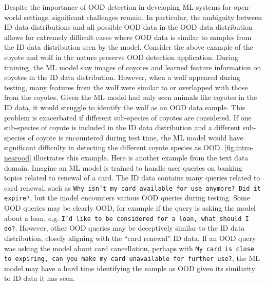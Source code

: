 Despite the importance of OOD detection in developing ML systems for open-world settings, significant challenges remain. In particular, the ambiguity between ID data distributions and all possible OOD data in the OOD data distribution allows for extremely difficult cases where OOD data is similar to samples from the ID data distribution seen by the model. Consider the above example of the coyote and wolf in the nature preserve OOD detection application. During training, the ML model saw images of coyotes and learned feature information on coyotes in the ID data distribution. However, when a wolf appeared during testing, many features from the wolf were similar to or overlapped with those from the coyotes. Given the ML model had only seen animals like coyotes in the ID data, it would struggle to identify the wolf as an OOD data sample. This problem is exacerbated if different sub-species of coyotes are considered. If one sub-species of coyote is included in the ID data distribution and a different sub-species of coyote is encountered during test time, the ML model would have significant difficulty in detecting the different coyote species as OOD. \ref{fig:intro-nearood} illustrates this example. Here is another example from the text data domain. Imagine an ML model is trained to handle user queries on banking topics related to renewal of a card. The ID data contains many queries related to card renewal, such as \texttt{Why isn't my card available for use anymore? Did it expire?}, but the model encounters various OOD queries during testing. Some OOD queries may be clearly OOD, for example if the query is asking the model about a loan, e.g. \texttt{I'd like to be considered for a loan, what should I do?}. However, other OOD queries may be deceptively similar to the ID data distribution, closely aligning with the ``card renewal'' ID data. If an OOD query was asking the model about card cancellation, perhaps with \texttt{My card is close to expiring, can you make my card unavailable for further use?}, the ML model may have a hard time identifying the sample as OOD given its similarity to ID data it has seen.

